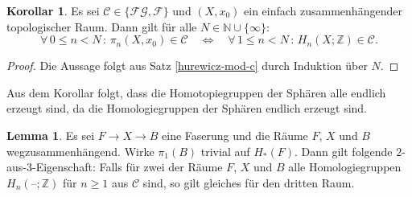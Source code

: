 \documentclass[11pt, a4paper, german]{article}
\theoremstyle{definition}
\newtheorem{lem}{Lemma}
\newtheorem{kor}{Korollar}
\theoremstyle{remark}
\newcommand{\N}{\mathbb{N}} %
\newcommand{\Z}{\mathbb{Z}} %
\newcommand{\fa}[1]{\forall \, {#1} \,:\,}
\newcommand{\blank}{\text{--}} %
\newcommand{\SC}{\mathcal{C}} %
\newcommand{\FG}{\mathcal{FG}} %
\newcommand{\F}{\mathcal{F}} %
\begin{document}
\begin{kor}\label{homotopy-in-c-iff-homology-in-c}
  Es sei $\SC \in \{ \FG, \F \}$ und
  $(X, x_0)$ ein einfach zusammenhängender topologischer Raum.
  Dann gilt für alle $N \in \N \cup \{ \infty \}$:
  \[
    \fa{0 \leq n < N} \pi_n(X, x_0) \in \SC
    \quad \iff \quad
    \fa{1 \leq n < N} H_n(X; \Z) \in \SC.
  \]
\end{kor}

\begin{proof}
  Die Aussage folgt aus Satz \ref{hurewicz-mod-c} durch Induktion über $N$.
\end{proof}

Aus dem Korollar folgt, dass die Homotopiegruppen der Sphären alle endlich erzeugt sind, da die Homologiegruppen der Sphären endlich erzeugt sind.

\begin{lem}\label{two-of-three}
  Es sei $F \to X \to B$ eine Faserung und die Räume $F$, $X$ und $B$ wegzusammenhängend.
  Wirke $\pi_1(B)$ trivial auf $H_*(F)$.
  Dann gilt folgende $2$-aus-$3$-Eigenschaft: Falls für zwei der Räume $F$, $X$ und $B$ alle Homologiegruppen $H_n(\blank; \Z)$ für $n \geq 1$ aus $\SC$ sind, so gilt gleiches für den dritten Raum.
\end{lem}
\end{document}
